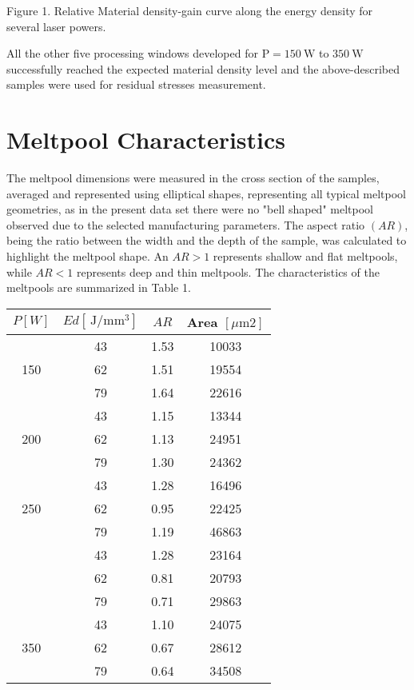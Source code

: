 \documentclass[10pt]{article}
\begin{document}
Figure 1. Relative Material density-gain curve along the energy density for several laser powers.

All the other five processing windows developed for $\mathrm{P}=150 \mathrm{~W}$ to $350 \mathrm{~W}$ successfully reached the expected material density level and the above-described samples were used for residual stresses measurement.

\section*{Meltpool Characteristics}
The meltpool dimensions were measured in the cross section of the samples, averaged and represented using elliptical shapes, representing all typical meltpool geometries, as in the present data set there were no "bell shaped" meltpool observed due to the selected manufacturing parameters. The aspect ratio $(A R)$, being the ratio between the width and the depth of the sample, was calculated to highlight the meltpool shape. An $A R>1$ represents shallow and flat meltpools, while $A R<1$ represents deep and thin meltpools. The characteristics of the meltpools are summarized in Table 1.

\begin{center}
\begin{tabular}{cccc}
\hline
$P[W]$ & $E d\left[\mathrm{~J} / \mathrm{mm}^{3}\right]$ & $A R$ & Area $[\mu \mathrm{m} 2]$ \\
\hline
\multirow{3}{*}{150} & 43 & 1.53 & 10033 \\
 & 62 & 1.51 & 19554 \\
 & 79 & 1.64 & 22616 \\
\hline
\multirow{3}{*}{200} & 43 & 1.15 & 13344 \\
 & 62 & 1.13 & 24951 \\
 & 79 & 1.30 & 24362 \\
\hline
\multirow{3}{*}{250} & 43 & 1.28 & 16496 \\
 & 62 & 0.95 & 22425 \\
 & 79 & 1.19 & 46863 \\
\hline
 & 43 & 1.28 & 23164 \\
 & 62 & 0.81 & 20793 \\
 & 79 & 0.71 & 29863 \\
\hline
 & 43 & 1.10 & 24075 \\
350 & 62 & 0.67 & 28612 \\
 & 79 & 0.64 & 34508 \\
\hline
\end{tabular}
\end{center}
\end{document}
